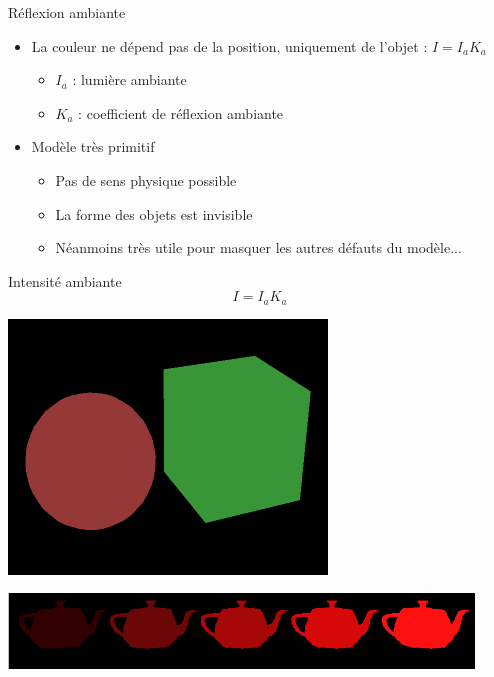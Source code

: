 \begin{frame}[t]{Réflexion ambiante}
  \begin{itemize}
    \item La couleur ne dépend pas de la position, uniquement de l'objet : $I = I_a K_a$
    \begin{itemize}
      \item $I_a$ : lumière ambiante
      \item $K_a$ : coefficient de réflexion ambiante
    \end{itemize}
    \item Modèle très primitif
    \begin{itemize}
      \item Pas de sens physique possible
      \item La forme des objets est invisible
      \item Néanmoins très utile pour masquer les autres défauts du modèle...
    \end{itemize}
  \end{itemize}
\end{frame}

\begin{frame}[t]{Intensité ambiante}
$$I = I_a K_a$$
\begin{center}
\includegraphics[width=.3\textwidth]{figs/amb1.png} \\
\end{center}

\begin{center}
\includegraphics[height=2cm]{figs/amb2.png}
\end{center}

\end{frame}

